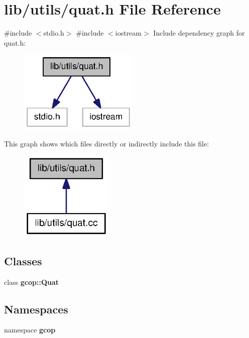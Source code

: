 \section{lib/utils/quat.h \-File \-Reference}
\label{quat_8h}
{\ttfamily \#include $<$stdio.\-h$>$}\*
{\ttfamily \#include $<$iostream$>$}\*
\-Include dependency graph for quat.\-h\-:
\nopagebreak
\begin{figure}[H]
\begin{center}
\leavevmode
\includegraphics[width=162pt]{quat_8h__incl}
\end{center}
\end{figure}
\-This graph shows which files directly or indirectly include this file\-:
\nopagebreak
\begin{figure}[H]
\begin{center}
\leavevmode
\includegraphics[width=126pt]{quat_8h__dep__incl}
\end{center}
\end{figure}
\subsection*{\-Classes}
\begin{DoxyCompactItemize}
\item 
class {\bf gcop\-::\-Quat}
\end{DoxyCompactItemize}
\subsection*{\-Namespaces}
\begin{DoxyCompactItemize}
\item 
namespace {\bf gcop}
\end{DoxyCompactItemize}
